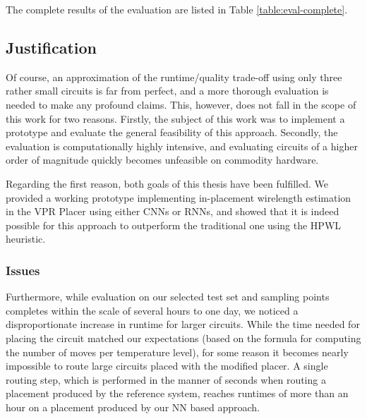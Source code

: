 The complete results of the evaluation are listed in Table \ref{table:eval-complete}.

\subsection{Justification}\label{ch:Justification}

Of course, an approximation of the runtime/quality trade-off using only three rather small circuits is far from perfect, and a more thorough evaluation is needed to make any profound claims. This, however, does not fall in the scope of this work for two reasons. Firstly, the subject of this work was to implement a prototype and evaluate the general feasibility of this approach. Secondly, the evaluation is computationally highly intensive, and evaluating circuits of a higher order of magnitude quickly becomes unfeasible on commodity hardware.

Regarding the first reason, both goals of this thesis have been fulfilled. We provided a working prototype implementing in-placement wirelength estimation in the \gls{VPR} Placer using either \glspl{CNN} or \glspl{RNN}, and showed that it is indeed possible for this approach to outperform the traditional one using the \gls{HPWL} heuristic.

\subsubsection{Issues}

Furthermore, while evaluation on our selected test set and sampling points completes within the scale of several hours to one day, we noticed a disproportionate increase in runtime for larger circuits. While the time needed for placing the circuit matched our expectations (based on the formula for computing the number of moves per temperature level), for some reason it becomes nearly impossible to route large circuits placed with the modified placer. A single routing step, which is performed in the manner of seconds when routing a placement produced by the reference system, reaches runtimes of more than an hour on a placement produced by our \gls{NN} based approach. 

